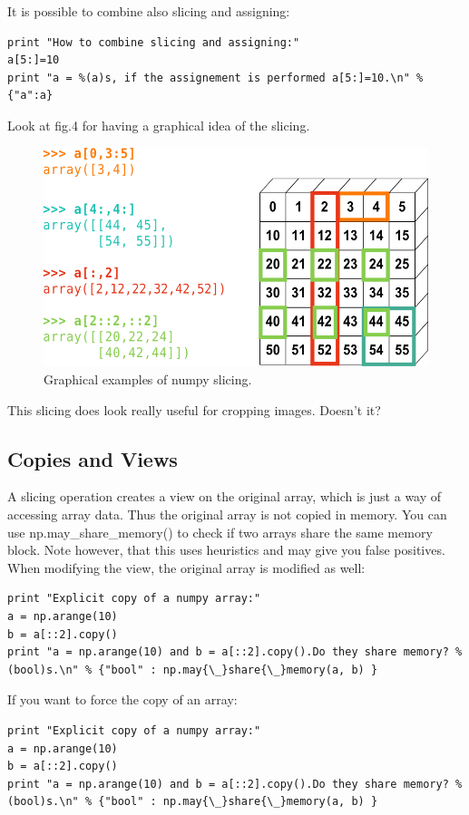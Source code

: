 \documentclass[aps,letterpaper,10pt]{revtex4}
\begin{document}
It is possible to combine also slicing and assigning:
\begin{lstlisting}
print "How to combine slicing and assigning:"
a[5:]=10
print "a = %(a)s, if the assignement is performed a[5:]=10.\n" % {"a":a} 
\end{lstlisting}
Look at fig.4 for having a graphical idea of the slicing.
\begin{figure}[h]
\includegraphics[scale=0.4]{img/numpy_slicing.png}
\centering
\caption{Graphical examples of numpy slicing.}\label{fig:4}
\end{figure}

This slicing does look really useful for cropping images. Doesn't it?

\subsection{Copies and Views}
A slicing operation creates a view on the original array, which is just a way of accessing array data. Thus the original array is not copied in memory. You can use np.may{\_}share{\_}memory() to check if two arrays share the same memory block. Note however, that this uses heuristics and may give you false positives. When modifying the view, the original array is modified as well:
\begin{lstlisting}
print "Explicit copy of a numpy array:"
a = np.arange(10)
b = a[::2].copy()
print "a = np.arange(10) and b = a[::2].copy().Do they share memory? %(bool)s.\n" % {"bool" : np.may{\_}share{\_}memory(a, b) }
\end{lstlisting}
If you want to force the copy of an array:
\begin{lstlisting}
print "Explicit copy of a numpy array:"
a = np.arange(10)
b = a[::2].copy()
print "a = np.arange(10) and b = a[::2].copy().Do they share memory? %(bool)s.\n" % {"bool" : np.may{\_}share{\_}memory(a, b) }
\end{lstlisting}
\end{document}
